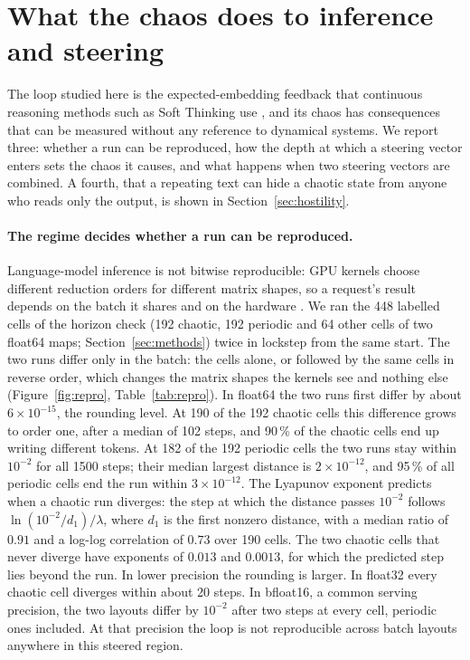 \section{What the chaos does to inference and steering}
\label{sec:consequences}
The loop studied here is the expected-embedding feedback that continuous reasoning methods such as Soft Thinking use
\cite{zhang2025softthinking}, and its chaos has consequences that can be measured without any reference to dynamical
systems. We report three: whether a run can be reproduced, how the depth at which a steering vector enters sets the
chaos it causes, and what happens when two steering vectors are combined. A fourth, that a repeating text can hide a
chaotic state from anyone who reads only the output, is shown in Section~\ref{sec:hostility}.

\paragraph{The regime decides whether a run can be reproduced.} Language-model inference is not bitwise
reproducible: GPU kernels choose different reduction orders for different matrix shapes, so a request's result depends
on the batch it shares and on the hardware \cite{he2025nondeterminism,yuan2025nondeterminism}. We ran the 448 labelled
cells of the horizon check (192 chaotic, 192 periodic and 64 other cells of two float64 maps; Section~\ref{sec:methods})
twice in lockstep from the same start. The two runs differ only in the batch: the cells alone, or followed by the same
cells in reverse order, which changes the matrix shapes the kernels see and nothing else (Figure~\ref{fig:repro},
Table~\ref{tab:repro}). In float64 the two runs first differ by about $6\times10^{-15}$, the rounding level. At 190 of
the 192 chaotic cells this difference grows to order one, after a median of 102 steps, and 90\,\% of the chaotic cells
end up writing different tokens. At 182 of the 192 periodic cells the two runs stay within $10^{-2}$ for all 1500
steps; their median largest distance is $2\times10^{-12}$, and 95\,\% of all periodic cells end the run within
$3\times10^{-12}$. The Lyapunov exponent predicts when a chaotic run
diverges: the step at which the distance passes $10^{-2}$ follows $\ln(10^{-2}/d_1)/\lambda$, where $d_1$ is the first
nonzero distance, with a median ratio of $0.91$ and a log-log correlation of $0.73$ over 190 cells. The two chaotic
cells that never diverge have exponents of $0.013$ and $0.0013$, for which the predicted step lies beyond the run. In
lower precision the rounding is larger. In float32 every chaotic cell diverges within about 20 steps. In bfloat16, a
common serving precision, the two layouts differ by $10^{-2}$ after two steps at every cell, periodic ones included.
At that precision the loop is not reproducible across batch layouts anywhere in this steered region.

